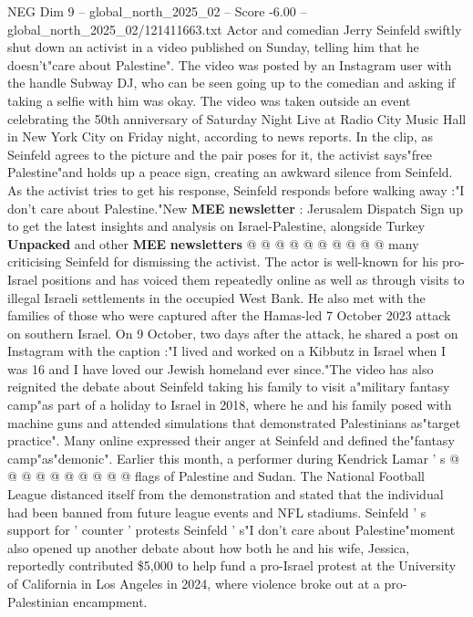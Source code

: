 \begin{textsample}{NEG Dim 9 – global\_north\_2025\_02 – Score -6.00 – global\_north\_2025\_02/121411663.txt}  \label{ex:f9_neg_011}
Actor and comedian Jerry Seinfeld swiftly shut down an activist in a video published on Sunday, telling him that he doesn't"care about Palestine".
The video was posted by an Instagram user with the handle Subway DJ, who can be seen going up to the comedian and asking if taking a selfie with him was okay.
The video was taken outside an event celebrating the 50th anniversary of Saturday Night Live at Radio City Music Hall in New York City on Friday night, according to news reports.
In the clip, as Seinfeld agrees to the picture and the pair poses for it, the activist says"free Palestine"and holds up a peace sign, creating an awkward silence from Seinfeld.
As the activist tries to get his response, Seinfeld responds before walking away :"I don't care about Palestine."New \textbf{MEE} \textbf{newsletter} : Jerusalem Dispatch Sign up to get the latest insights and analysis on Israel-Palestine, alongside Turkey \textbf{Unpacked} and other \textbf{MEE} \textbf{newsletters} @ @ @ @ @ @ @ @ @ @ many criticising Seinfeld for dismissing the activist.
The actor is well-known for his pro-Israel positions and has voiced them repeatedly online as well as through visits to illegal Israeli settlements in the occupied West Bank.
He also met with the families of those who were captured after the Hamas-led 7 October 2023 attack on southern Israel.
On 9 October, two days after the attack, he shared a post on Instagram with the caption :"I lived and worked on a Kibbutz in Israel when I was 16 and I have loved our Jewish homeland ever since."The video has also reignited the debate about Seinfeld taking his family to visit a"military fantasy camp"as part of a holiday to Israel in 2018, where he and his family posed with machine guns and attended simulations that demonstrated Palestinians as"target practice".
Many online expressed their anger at Seinfeld and defined the"fantasy camp"as"demonic".
Earlier this month, a performer during Kendrick Lamar ' s @ @ @ @ @ @ @ @ @ @ flags of Palestine and Sudan.
The National Football League distanced itself from the demonstration and stated that the individual had been banned from future league events and NFL stadiums.
Seinfeld ' s support for ' counter ' protests Seinfeld ' s"I don't care about Palestine"moment also opened up another debate about how both he and his wife, Jessica, reportedly contributed \$5,000 to help fund a pro-Israel protest at the University of California in Los Angeles in 2024, where violence broke out at a pro-Palestinian encampment.

\end{textsample}
